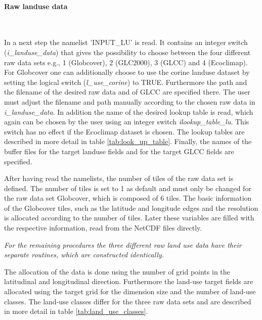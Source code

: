 \documentclass[a4paper,10pt,DIV14,BCOR1cm,titlepage,twoside]{scrartcl}
\begin{document}
\paragraph{Raw landuse data} \ \par\medskip\noindent
In a next step the namelist 'INPUT\_LU' is read. It contains an integer switch (\textit{i\_landuse\_data}) that gives the possibility to choose between the four different raw data sets e.g., 1 (Globcover), 2 (GLC2000), 3 (GLCC) and 4 (Ecoclimap). For Globcover one can additionally choose to use the corine landuse dataset by setting the logical switch (\textit{l\_use\_corine}) to TRUE.  Furthermore the path and the filename of the desired raw data and of GLCC are specified there. The user must adjust the filename and path manually according to the chosen raw data in \textit{i\_landuse\_data}. In addition the name of the desired lookup table is read, which again can be chosen by the user using an integer switch \textit{ilookup\_table\_lu}. This switch has no effect if the Ecoclimap dataset is chosen. The lookup tables are described in more detail in table \ref{tab:look_up_table}. Finally, the names of the buffer files for the target landuse fields and for the target GLCC fields are specified. \par\medskip\noindent
After having read the namelists, the number of tiles of the raw data set is defined. The number of tiles is set to 1 as default and must only be changed for the raw data set Globcover, which is composed of 6 tiles. The basic information of the Globcover tiles, such as the latitude and longitude edges and the resolution is allocated according to the number of tiles. Later these variables are filled with the respective information, read from the NetCDF files directly. \par\medskip\noindent
\textit{For the remaining procedures the three different raw land use data have their separate routines, which are constructed identically.}  \par\medskip\noindent
The allocation of the data is done using the number of grid points in the latitudinal and longitudinal direction. Furthermore the land-use target fields are allocated using the target grid for the dimension size and the number of land-use classes. The land-use classes differ for the three raw data sets and are described in more detail in table \ref{tab:land_use_classes}. \par\medskip\noindent
\end{document}
